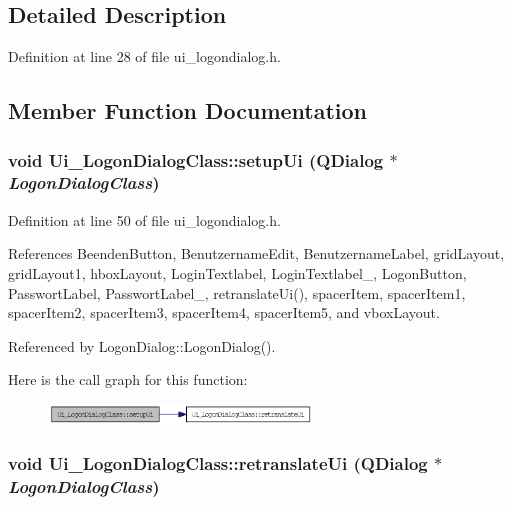 \subsection{Detailed Description}


Definition at line 28 of file ui\_\-logondialog.h.

\subsection{Member Function Documentation}
\hypertarget{class_ui___logon_dialog_class_eb9d8373b0591536ac65680deb7fecb8}{
\subsubsection[setupUi]{\setlength{\rightskip}{0pt plus 5cm}void Ui\_\-LogonDialogClass::setupUi (QDialog $\ast$ {\em LogonDialogClass})}}
\label{class_ui___logon_dialog_class_eb9d8373b0591536ac65680deb7fecb8}




Definition at line 50 of file ui\_\-logondialog.h.

References BeendenButton, BenutzernameEdit, BenutzernameLabel, gridLayout, gridLayout1, hboxLayout, LoginTextlabel, LoginTextlabel\_, LogonButton, PasswortLabel, PasswortLabel\_, retranslateUi(), spacerItem, spacerItem1, spacerItem2, spacerItem3, spacerItem4, spacerItem5, and vboxLayout.

Referenced by LogonDialog::LogonDialog().

Here is the call graph for this function:\nopagebreak
\begin{figure}[H]
\begin{center}
\leavevmode
\includegraphics[width=199pt]{class_ui___logon_dialog_class_eb9d8373b0591536ac65680deb7fecb8_cgraph}
\end{center}
\end{figure}
\hypertarget{class_ui___logon_dialog_class_02e27cd8fdcb0196bd54d19c92fdfe96}{
\subsubsection[retranslateUi]{\setlength{\rightskip}{0pt plus 5cm}void Ui\_\-LogonDialogClass::retranslateUi (QDialog $\ast$ {\em LogonDialogClass})}}
\label{class_ui___logon_dialog_class_02e27cd8fdcb0196bd54d19c92fdfe96}




